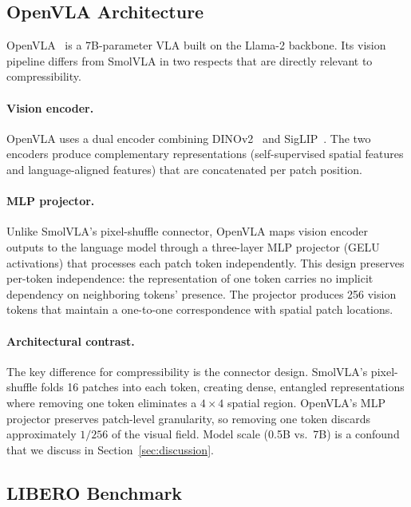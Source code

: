 \subsection{OpenVLA Architecture}
\label{sec:openvla_arch}

OpenVLA~\cite{kim2024openvla} is a 7B-parameter VLA built on the Llama-2 backbone. Its vision pipeline differs from SmolVLA in two respects that are directly relevant to compressibility.

\paragraph{Vision encoder.}
OpenVLA uses a dual encoder combining DINOv2~\cite{oquab2023dinov2} and SigLIP~\cite{zhai2023siglip}. The two encoders produce complementary representations (self-supervised spatial features and language-aligned features) that are concatenated per patch position.

\paragraph{MLP projector.}
Unlike SmolVLA's pixel-shuffle connector, OpenVLA maps vision encoder outputs to the language model through a three-layer MLP projector (GELU activations) that processes each patch token independently. This design preserves per-token independence: the representation of one token carries no implicit dependency on neighboring tokens' presence. The projector produces 256 vision tokens that maintain a one-to-one correspondence with spatial patch locations.

\paragraph{Architectural contrast.}
The key difference for compressibility is the connector design. SmolVLA's pixel-shuffle folds 16 patches into each token, creating dense, entangled representations where removing one token eliminates a $4 \times 4$ spatial region. OpenVLA's MLP projector preserves patch-level granularity, so removing one token discards approximately $1/256$ of the visual field. Model scale (0.5B vs.\ 7B) is a confound that we discuss in Section~\ref{sec:discussion}.

\subsection{LIBERO Benchmark}
\label{sec:libero_bench}

